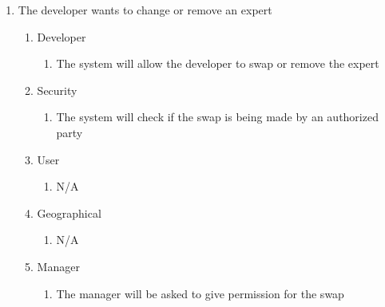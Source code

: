 \documentclass[titlepage]{article}
\begin{document}
\begin{enumerate}[{BE}1.]
	\item The developer wants to change or remove an expert
	\begin{enumerate}[{VP\theenumi}.1]
		\item Developer
			\begin{enumerate}
				\item The system will allow the developer to swap or remove the expert
			\end{enumerate}
		\item Security
			\begin{enumerate}
				\item The system will check if the swap is being made by an authorized party
			\end{enumerate}
		\item User
            \begin{enumerate}
                \item N/A
            \end{enumerate}
        \item Geographical
            \begin{enumerate}
                \item N/A
            \end{enumerate}
        \item Manager
            \begin{enumerate}
                \item The manager will be asked to give permission for the swap
            \end{enumerate}
	\end{enumerate}


\end{enumerate}
\end{document}
